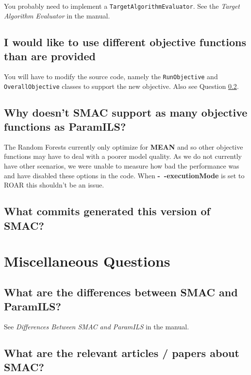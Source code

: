 \documentclass[11pt,letterpaper,oneside]{article}
\begin{document}
	You probably need to implement a \texttt{TargetAlgorithmEvaluator}. See the \emph{Target Algorithm Evaluator} in the manual.

\subsection{I would like to use different objective functions than are provided}

	You will have to modify the source code, namely the \texttt{RunObjective} and \texttt{OverallObjective} classes to support the new objective. Also see Question \ref{sec:rf-objectives}.

\subsection{Why doesn't SMAC support as many objective functions as ParamILS?}
\label{sec:rf-objectives}

	The Random Forests currently only optimize for \textbf{MEAN} and so other objective functions may have to deal with a poorer model quality. As we do not currently have other scenarios, we were unable to measure how bad the performance was and have disabled these options in the code. When \textbf{-~$\!$-executionMode} is set to ROAR this shouldn't be an issue.

\subsection{What commits generated this version of SMAC?}



\section{Miscellaneous Questions}

\subsection{What are the differences between SMAC and ParamILS?}

	See \emph{Differences Between SMAC and ParamILS} in the manual.


\subsection{What are the relevant articles / papers about SMAC?}
\end{document}
